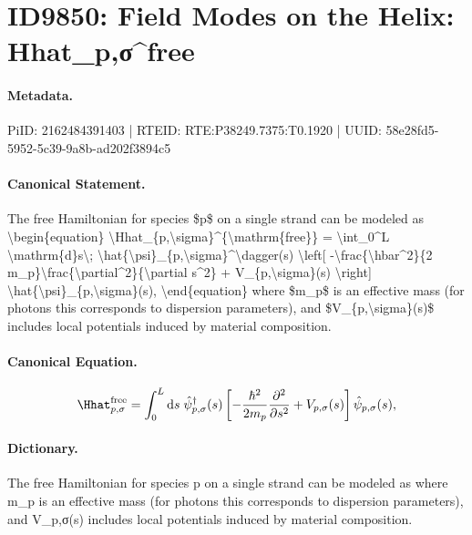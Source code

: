 \section*{ID9850: Field Modes on the Helix: Hhat\_p,σ\textasciicircum{}free}
\paragraph{Metadata.}
PiID: 2162484391403 | RTEID: RTE:P38249.7375:T0.1920 | UUID: 58e28fd5-5952-5c39-9a8b-ad202f3894c5

\paragraph{Canonical Statement.}
The free Hamiltonian for species \$p\$ on a single strand can be modeled as \textbackslash{}begin\{equation\} \textbackslash{}Hhat\_\{p,\textbackslash{}sigma\}\textasciicircum{}\{\textbackslash{}mathrm\{free\}\} = \textbackslash{}int\_0\textasciicircum{}L \textbackslash{}mathrm\{d\}s\textbackslash{}; \textbackslash{}hat\{\textbackslash{}psi\}\_\{p,\textbackslash{}sigma\}\textasciicircum{}\textbackslash{}dagger(s) \textbackslash{}left[ -\textbackslash{}frac\{\textbackslash{}hbar\textasciicircum{}2\}\{2 m\_p\}\textbackslash{}frac\{\textbackslash{}partial\textasciicircum{}2\}\{\textbackslash{}partial s\textasciicircum{}2\} + V\_\{p,\textbackslash{}sigma\}(s) \textbackslash{}right] \textbackslash{}hat\{\textbackslash{}psi\}\_\{p,\textbackslash{}sigma\}(s), \textbackslash{}end\{equation\} where \$m\_p\$ is an effective mass (for photons this corresponds to dispersion parameters), and \$V\_\{p,\textbackslash{}sigma\}(s)\$ includes local potentials induced by material composition.

\paragraph{Canonical Equation.}
\[
\Hhat_{p,\sigma}^{\mathrm{free}} = \int_0^L \mathrm{d}s\; \hat{\psi}_{p,\sigma}^\dagger(s) \left[ -\frac{\hbar^2}{2 m_p}\frac{\partial^2}{\partial s^2} + V_{p,\sigma}(s) \right] \hat{\psi}_{p,\sigma}(s),
\]

\paragraph{Dictionary.}
The free Hamiltonian for species p on a single strand can be modeled as where m\_p is an effective mass (for photons this corresponds to dispersion parameters), and V\_p,σ(s) includes local potentials induced by material composition.

